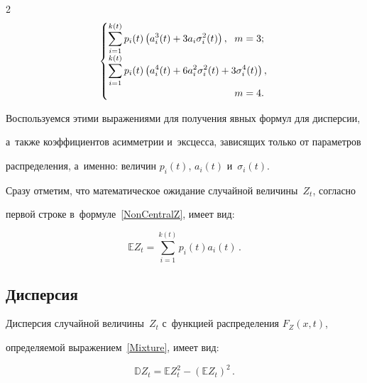 \begin{multicols}{2}
\begin{equation}
\begin{cases}
\displaystyle\sum\limits_{i=1}^{k(t)} p_i(t)\left(a_i^3(t)+3a_i\sigma_i^2(t)\right), &\hspace*{-15mm} m=3;\\

\displaystyle\sum\limits_{i=1}^{k(t)} p_i(t)\left(a_i^4(t)+6a_i^2\sigma_i^2(t)+3\sigma_i^4(t)

\right), &\\ 

& \hspace*{-15mm}m=4.

\end{cases}\!\!\! \!\!\label{NonCentralZ}

\end{equation}



Воспользуемся этими выражениями для получения явных формул для дисперсии, 

а~так\-же коэффициентов асимметрии и~эксцесса, зависящих только от параметров 

распределения, а~именно: величин $p_i(t)$, $a_i(t)$ и~$\sigma_i(t)$.



Сразу отметим, что математическое ожидание случайной величины~$Z_t$, согласно 

первой строке в~формуле~\eqref{NonCentralZ}, имеет вид:

\begin{equation}

\mathbb{E} Z_t=\sum\limits_{i=1}^{k(t)} p_i(t) a_i(t)\,. 

\label{Expectation}

\end{equation}



\subsection{Дисперсия}



Дисперсия случайной величины~$Z_t$ с~функцией распределения $F_Z(x,t)$, 

определяемой выражением~\eqref{Mixture}, имеет вид:

\begin{equation}

\mathbb{D} Z_t=\mathbb{E} Z_t^2-\left(\mathbb{E} Z_t\right)^2\,. 

\label{Var}

\end{equation}




\end{multicols}
